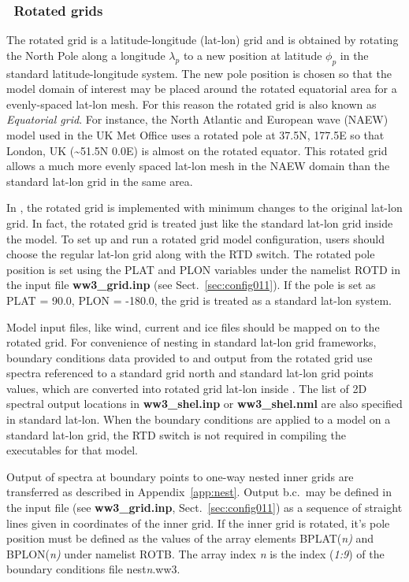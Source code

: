 \vssub
\subsubsection{~Rotated grids} \label{sub:num_space_rotagrid}

\noindent
The rotated grid is a latitude-longitude (lat-lon) grid and is obtained by
rotating the North Pole along a longitude $\lambda_{p}$ to a new position at
latitude $\phi_{p}$ in the standard latitude-longitude system.  The new
pole position is chosen so that the model domain of interest may be placed
around the rotated equatorial area for a evenly-spaced lat-lon mesh. For this
reason the rotated grid is also known as \emph{Equatorial grid}. For instance,
the North Atlantic and European wave (NAEW) model used in the UK Met Office
uses a rotated pole at 37.5N, 177.5E so that London, UK
(\textasciitilde{}51.5N 0.0E) is almost on the rotated equator. This rotated
grid allows a much more evenly spaced lat-lon mesh in the NAEW domain than the
standard lat-lon grid in the same area. 

In \ws, the rotated grid is implemented with minimum changes to the original
lat-lon grid. In fact, the rotated grid is treated just like the standard 
lat-lon grid inside the model. To set up and run a rotated grid model configuration,
users should choose the regular lat-lon grid along with the {\code RTD} switch.
The rotated pole position is set using the {\code PLAT} and {\code PLON} variables
under the namelist {\code ROTD} in the input file {\bf ww3\_grid.inp}
(see Sect.~\ref{sec:config011}). If the pole is set as {\code PLAT = 90.0},
{\code PLON = -180.0}, the grid is treated as a standard lat-lon system.

Model input files, like wind, current and ice files
should be mapped on to the rotated grid. For convenience of nesting in standard
lat-lon grid frameworks, boundary conditions data provided to and output from the
rotated grid use spectra referenced to a standard grid north and standard lat-lon
grid points values, which are converted into rotated grid lat-lon inside \ws.
The list of 2D spectral output locations in {\bf ww3\_shel.inp} or
{\bf ww3\_shel.nml} are also specified in standard lat-lon. When the boundary
conditions are applied to a model on a standard lat-lon grid, the {\code RTD}
switch is not required in compiling the executables for that model.

Output of spectra at boundary points to one-way nested inner grids are transferred
as described in Appendix~\ref{app:nest}. Output b.c.\ may be defined in the input
file (see {\bf ww3\_grid.inp}, Sect.~\ref{sec:config011}) as a sequence of straight
lines given in coordinates of the inner grid. If the inner grid is rotated, it's
pole position must be defined as the values of the array elements
{\code BPLAT(\sl{n})} and {\code BPLON(\sl{n})} under namelist {\code ROTB}. The
array index {\sl{n}} is the index ({\sl{1:9}}) of the boundary conditions file
{\file nest{\sl{n}}.ww3}.

